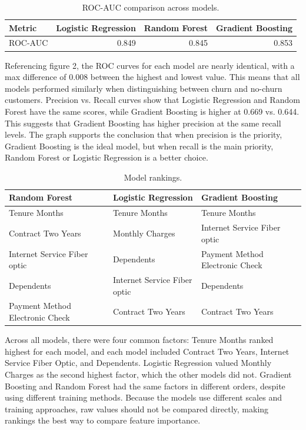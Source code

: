 \documentclass{article}
\begin{document}
\begin{table}[H]
\centering
\begin{tabular}{lrrr}
\toprule
\textbf{Metric} & \textbf{Logistic Regression} & \textbf{Random Forest} & \textbf{Gradient Boosting} \\
\midrule
ROC-AUC & 0.849 & 0.845 & 0.853 \\
\bottomrule
\end{tabular}
\caption{ROC-AUC comparison across models.}
\label{tab:rocauc}
\end{table}

Referencing figure 2, the ROC curves for each model are nearly identical, with a max difference of 0.008 between the highest and lowest value. This means that all models performed similarly when distinguishing between churn and no-churn customers. Precision vs. Recall curves show that Logistic Regression and Random Forest have the same scores, while Gradient Boosting is higher at 0.669 vs. 0.644. This suggests that Gradient Boosting has higher precision at the same recall levels. The graph supports the conclusion that when precision is the priority, Gradient Boosting is the ideal model, but when recall is the main priority, Random Forest or Logistic Regression is a better choice.


\begin{table}[H]
\centering
\footnotesize
\begin{tabularx}{\linewidth}{XXX}
\toprule
\textbf{Random Forest} & \textbf{Logistic Regression} & \textbf{Gradient Boosting} \\
\midrule
Tenure Months & Tenure Months & Tenure Months \\
\midrule
Contract Two Years & Monthly Charges & Internet Service Fiber optic \\
\midrule
Internet Service Fiber optic & Dependents & Payment Method Electronic Check \\
\midrule
Dependents & Internet Service Fiber optic & Dependents \\
\midrule
Payment Method Electronic Check & Contract Two Years & Contract Two Years \\
\bottomrule
\end{tabularx}
\caption{Model rankings.}
\label{tab:model-rankings}
\end{table}

Across all models, there were four common factors: Tenure Months ranked highest for each model, and each model included Contract Two Years, Internet Service Fiber Optic, and Dependents. Logistic Regression valued Monthly Charges as the second highest factor, which the other models did not. Gradient Boosting and Random Forest had the same factors in different orders, despite using different training methods. Because the models use different scales and training approaches, raw values should not be compared directly, making rankings the best way to compare feature importance.
\end{document}
